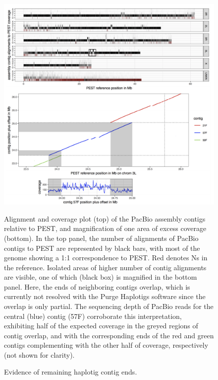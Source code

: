 \begin{figure}[htbp!]

\caption{Evidence of remaining haplotig contig ends.}

\label{figure:haplotig}
\begin{centering}
\includegraphics[width=\textwidth]{haplotigity.png}
\par{Alignment and coverage plot (top) of the PacBio assembly contigs relative to PEST,
and magnification of one area of excess coverage (bottom). In the top panel, the number of
alignments of PacBio contigs to PEST are represented by black bars, with most of the genome
showing a 1:1 correspondence to PEST. Red denotes Ns in the reference. Isolated areas of
higher number of contig alignments are visible, one of which (black box) is magnified in the
bottom panel. Here, the ends of neighboring contigs overlap, which is currently not resolved with
the Purge Haplotigs software since the overlap is only partial. The sequencing depth of PacBio
reads for the central (blue) contig (57F) corroborate this interpretation, exhibiting half of the
expected coverage in the greyed regions of contig overlap, and with the corresponding ends of
the red and green contigs complementing with the other half of coverage, respectively (not
shown for clarity).}
\end{centering}
\end{figure}

